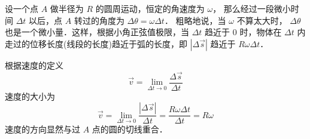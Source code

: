 

设一个点 $A$ 做半径为 $R$ 的圆周运动，恒定的角速度为 $\omega $， 那么经过一段微小时间 $\Delta t$ 以后，点 $A$ 转过的角度为 $\Delta \theta  = \omega \Delta t$． 粗略地说，当 $\omega $ 不算太大时， $\Delta \theta $ 也是一个微小量．这样，根据小角正弦值极限，当 $\Delta t$ 趋近于 $0$ 时，物体在 $\Delta t$ 内走过的位移长度(线段的长度)趋近于弧的长度，即 $\left| {\Delta \vec s} \right|$ 趋近于 $R\omega \Delta t$． 

根据速度的定义 
\begin{equation}
\vec v = \mathop {\lim }\limits_{\Delta t \to 0} \frac{{\Delta \vec s}}{{\Delta t}}
\end{equation}
速度的大小为
\begin{equation}
\vec v = \mathop {\lim }\limits_{\Delta t \to 0} \frac{{\left| {\Delta \vec s} \right|}}{{\Delta t}} = \frac{{R\omega \Delta t}}{{\Delta t}} = R\omega 
\end{equation}
速度的方向显然与过 $A$ 点的圆的切线重合．











